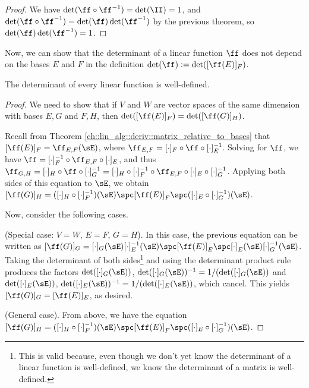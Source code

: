 \begin{proof}
   We have $\det(\ff \circ \ff^{-1}) = \det(\II) = 1$, and $\det(\ff \circ \ff^{-1}) = \det(\ff) \det(\ff^{-1})$ by the previous theorem, so $\det(\ff) \det(\ff^{-1}) = 1$.
\end{proof}

Now, we can show that the determinant of a linear function $\ff$ does not depend on the bases $E$ and $F$ in the definition $\det(\ff) := \det([\ff(E)]_F)$. 

\begin{theorem}
\label{ch::lin_alg::rmk::det_well_defined}
    The determinant of every linear function is well-defined.
\end{theorem}

\begin{proof}
    We need to show that if $V$ and $W$ are vector spaces of the same dimension with bases $E, G$ and $F, H$, then $\det([\ff(E)]_F) = \det([\ff(G)]_H)$.

    Recall from Theorem \ref{ch::lin_alg::deriv::matrix_relative_to_bases} that $[\ff(E)]_F = \ff_{E,F}(\sE)$, where $\ff_{E,F} = [\cdot]_F \circ \ff \circ [\cdot]_E^{-1}$. Solving for $\ff$, we have $\ff = [\cdot]_F^{-1} \circ \ff_{E,F} \circ [\cdot]_E$, and thus $\ff_{G,H} = [\cdot]_H \circ \ff \circ [\cdot]_G^{-1} = [\cdot]_H \circ [\cdot]_F^{-1} \circ \ff_{E,F} \circ [\cdot]_E \circ [\cdot]_G^{-1}$. Applying both sides of this equation to $\sE$, we obtain $[\ff(G)]_H = ([\cdot]_H \circ [\cdot]_F^{-1})(\sE) \spc [\ff(E)]_F \spc ([\cdot]_E \circ [\cdot]_G^{-1})(\sE)$.

    Now, consider the following cases.

    \fullindent
    {
        (Special case: $V = W$, $E = F$, $G = H$). In this case, the previous equation can be written as $[\ff(G)]_G = [\cdot]_G(\sE) [\cdot]_E^{-1}(\sE) \spc [\ff(E)]_E \spc [\cdot]_E(\sE) [\cdot]_G^{-1}(\sE)$. Taking the determinant of both sides\footnote{This is valid because, even though we don't yet know the determinant of a linear function is well-defined, we know the determinant of a matrix is well-defined.} and using the determinant product rule produces the factors $\det([\cdot]_G(\sE))$, $\det([\cdot]_G(\sE))^{-1} = 1/(\det([\cdot]_G(\sE))$ and $\det([\cdot]_E(\sE))$, $\det([\cdot]_E(\sE))^{-1} = 1/(\det([\cdot]_E(\sE))$, which cancel. This yields $[\ff(G)]_G = [\ff(E)]_E$, as desired. 
    }

    \fullindent
    {
        (General case). From above, we have the equation $[\ff(G)]_H = ([\cdot]_H \circ [\cdot]_F^{-1})(\sE) \spc [\ff(E)]_F \spc ([\cdot]_E \circ [\cdot]_G^{-1})(\sE)$. 

}
\end{proof}
